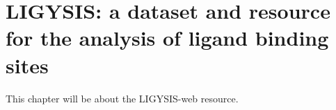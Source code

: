 \chapter{LIGYSIS: a dataset and resource for the analysis of ligand binding sites}

This chapter will be about the LIGYSIS-web resource.